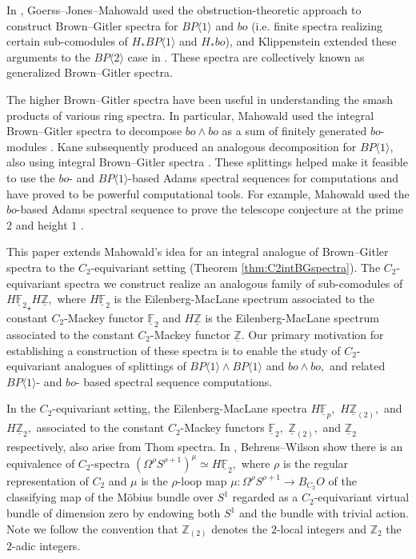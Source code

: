 \documentclass[]{amsart}  %
\theoremstyle{definition}
\numberwithin{equation}{section}
\numberwithin{figure}{section}
\newcommand{\mF}{{\mathbb F}}
\newcommand{\mZ}{{\mathbb Z}}
\newcommand{\umF}{\underline{\mF}}
\newcommand{\umZ}{\underline{\mZ}}
\newcommand{\0}{\langle 0 \rangle}
\begin{document}
In \cite{goerss1986some}, Goerss--Jones--Mahowald used the obstruction-theoretic approach to construct Brown--Gitler spectra for $BP\langle 1 \rangle$ and $bo$ (i.e. finite spectra realizing certain sub-comodules of $H_{*}BP\langle 1 \rangle$ and $H_{*}bo$), and Klippenstein extended these arguments to the $BP\langle 2 \rangle$ case in \cite{klippenstein1988brown}. These spectra are collectively known as generalized Brown--Gitler spectra. 

The higher Brown--Gitler spectra have been useful in understanding the smash products of various ring spectra. In particular, Mahowald used the integral Brown--Gitler spectra to decompose $bo \wedge bo$ as a sum of finitely generated $bo$-modules \cite{mahowald1981bo}. Kane subsequently produced an analogous decomposition for $BP\langle 1 \rangle$, also using integral Brown--Gitler spectra \cite{kane1981operations}. These splittings helped make it feasible to use the $bo$- and $BP\langle 1\rangle$-based Adams spectral sequences for computations and have proved to be powerful computational tools. For example, Mahowald used the $bo$-based Adams spectral sequence to prove the telescope conjecture at the prime $2$ and height $1$ \cite{mahowald1981bo}.

This paper extends Mahowald's idea for an integral analogue of Brown--Gitler spectra to the $C_2$-equivariant setting (Theorem \ref{thm:C2intBGspectra}). The $C_2$-equivariant spectra we construct realize an analogous family of sub-comodules of $H {\umF_2}_\star H \umZ,$ where $H \umF_2$ is the Eilenberg-MacLane spectrum associated to the constant $C_2$-Mackey functor $\umF_2$ and $H \umZ$ is the Eilenberg-MacLane spectrum associated to the constant $C_2$-Mackey functor $\umZ$. Our primary motivation for establishing a construction of these spectra is to enable the study of $C_2$-equivariant analogues of splittings of $BP \langle 1 \rangle \wedge BP \langle 1 \rangle$ and $bo \wedge bo,$ and related $BP \langle 1 \rangle$- and $bo$- based spectral sequence computations. 

In the $C_2$-equivariant setting, the Eilenberg-MacLane spectra $H \umF_p,$ $H \umZ_{(2)},$ and $H \umZ_2,$ associated to the constant $C_2$-Mackey functors $\umF_2,$ $\umZ_{(2)},$ and $\umZ_2$ respectively, also arise from Thom spectra. In \cite{BW2018}, Behrens--Wilson show there is an equivalence of $C_2$-spectra $(\Omega^\rho S^{\rho + 1})^\mu \simeq H \umF_2,$ where $\rho$ is the regular representation of $C_2$ and $\mu$ is the $\rho$-loop map
$ \mu: \Omega^\rho S^{\rho + 1} \to B_{C_2} O $
of the classifying map of the M\"{o}bius bundle over $S^1$ regarded as a $C_2$-equivariant virtual bundle of dimension zero by endowing both $S^1$ and the bundle with trivial action. Note we follow the convention that $\mZ_{(2)}$ denotes the $2$-local integers and $\mZ_2$ the $2$-adic integers.
\end{document}
